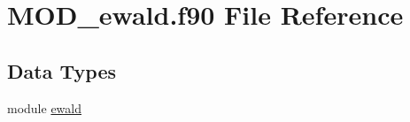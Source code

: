 \hypertarget{MOD__ewald_8f90}{\section{M\-O\-D\-\_\-ewald.\-f90 File Reference}
\label{MOD__ewald_8f90}
}
\subsection*{Data Types}
\begin{DoxyCompactItemize}
\item 
module \hyperlink{classewald}{ewald}
\end{DoxyCompactItemize}

